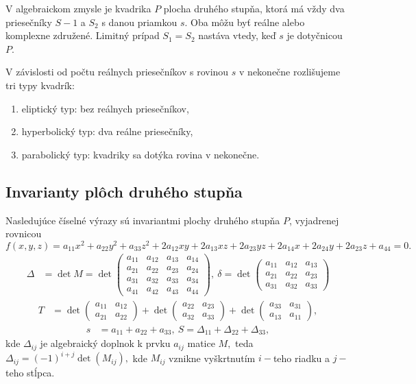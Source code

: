 V algebraickom zmysle je kvadrika $P$ plocha druhého stupňa, ktorá má vždy dva priesečníky $S-1$ a $S_2$ s danou priamkou $s$. Oba môžu byť reálne alebo komplexne združené. Limitný prípad $S_1 = S_2$ nastáva vtedy, keď $s$ je dotyčnicou $P$.

V závislosti od počtu reálnych priesečníkov s rovinou $s$ v nekonečne rozlišujeme tri typy kvadrík:
\begin{enumerate}
\item eliptický typ: bez reálnych priesečníkov,
\item hyperbolický typ: dva reálne priesečníky,
\item parabolický typ: kvadriky sa dotýka rovina v nekonečne.
\end{enumerate}
\subsection{Invarianty plôch druhého stupňa}
Nasledujúce číselné výrazy sú invariantmi plochy druhého stupňa $P$, vyjadrenej rovnicou 
\[ f(x, y, z) = a_{11}x^2 + a_{22}y^2 + a_{33}z^2 + 2a_{12}xy + 2a_{13}xz + 2a_{23}yz + 2a_{14}x + 2a_{24}y + 2a_{23}z + a_{44} = 0. \]
\begin{align*}
\Delta &= \det M = \det \begin{pmatrix} 
a_{11} & a_{12} & a_{13} & a_{14} \\ 
a_{21} & a_{22} & a_{23} & a_{24} \\
a_{31} & a_{32} & a_{33} & a_{34} \\
a_{41} & a_{42} & a_{43} & a_{44}
\end{pmatrix}, \
\delta = \det \begin{pmatrix} 
a_{11} & a_{12} & a_{13} \\ 
a_{21} & a_{22} & a_{23} \\ 
a_{31} & a_{32} & a_{33} 
\end{pmatrix}
\end{align*}
\begin{align*}
T &= \det \begin{pmatrix} 
a_{11} & a_{12} \\ 
a_{21} & a_{22} 
\end{pmatrix} + \det \begin{pmatrix} 
a_{22} & a_{23} \\ 
a_{32} & a_{33} 
\end{pmatrix} + \det \begin{pmatrix} 
a_{33} & a_{31} \\ 
a_{13} & a_{11} 
\end{pmatrix}, 
\end{align*}
\begin{align*}
s &= a_{11} + a_{22} + a_{33}, \ S = \Delta_{11} + \Delta_{22} + \Delta_{33}, 
\end{align*}
kde $ \Delta_{ij} $ je algebraický doplnok k prvku $a_{ij}$ matice $M, $ teda $\Delta_{ij} = (-1)^{i+j} \det(M_{ij}), $ kde $M_{ij}$ vznikne vyškrtnutím $i-$teho riadku a $j-$teho stĺpca.

